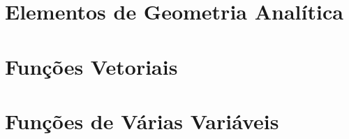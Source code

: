 \documentclass[14pt]{extreport}
\begin{document}

\chapter{Elementos de Geometria Analítica}



\chapter{Funções Vetoriais}


\chapter{Funções de Várias Variáveis}






%

%
%

\printindex
\end{document}
